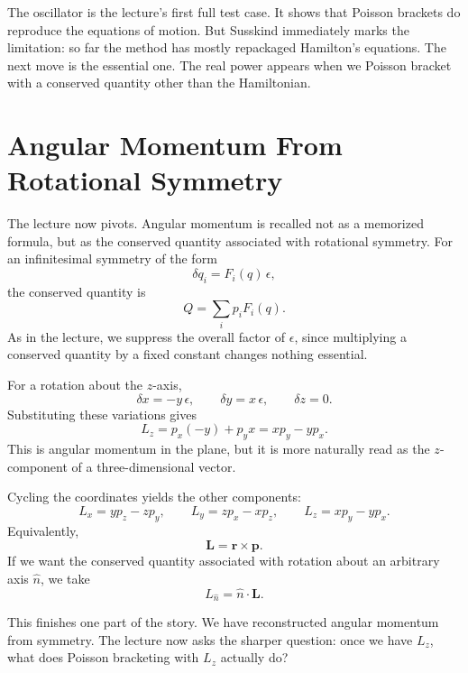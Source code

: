 The oscillator is the lecture's first full test case. It shows that Poisson brackets do reproduce the equations of motion. But Susskind immediately marks the limitation: so far the method has mostly repackaged Hamilton's equations. The next move is the essential one. The real power appears when we Poisson bracket with a conserved quantity other than the Hamiltonian.

\section{Angular Momentum From Rotational Symmetry}

The lecture now pivots. Angular momentum is recalled not as a memorized formula, but as the conserved quantity associated with rotational symmetry. For an infinitesimal symmetry of the form
\begin{equation}
\delta q_i=F_i(q)\,\epsilon,
\end{equation}
the conserved quantity is
\begin{equation}
Q=\sum_i p_i F_i(q).
\end{equation}
As in the lecture, we suppress the overall factor of \(\epsilon\), since multiplying a conserved quantity by a fixed constant changes nothing essential.

For a rotation about the \(z\)-axis,
\begin{equation}
\delta x=-y\,\epsilon,\qquad \delta y=x\,\epsilon,\qquad \delta z=0.
\end{equation}
Substituting these variations gives
\begin{equation}
L_z=p_x(-y)+p_yx=xp_y-yp_x.
\end{equation}
This is angular momentum in the plane, but it is more naturally read as the \(z\)-component of a three-dimensional vector.

Cycling the coordinates yields the other components:
\begin{equation}
L_x=yp_z-zp_y,\qquad
L_y=zp_x-xp_z,\qquad
L_z=xp_y-yp_x.
\end{equation}
Equivalently,
\begin{equation}
\mathbf L=\mathbf r\times\mathbf p.
\end{equation}
If we want the conserved quantity associated with rotation about an arbitrary axis \(\hat n\), we take
\begin{equation}
L_{\hat n}=\hat n\cdot \mathbf L.
\end{equation}

This finishes one part of the story. We have reconstructed angular momentum from symmetry. The lecture now asks the sharper question: once we have \(L_z\), what does Poisson bracketing with \(L_z\) actually do?

